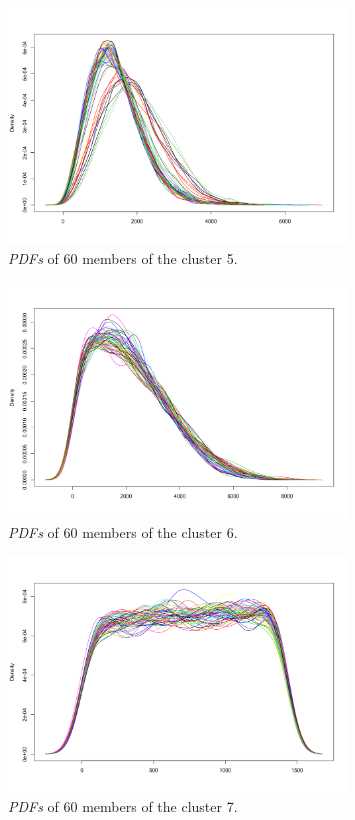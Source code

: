 \begin{figure}[H]
    \centering
    \includegraphics[width=0.8\textwidth]{images/cluster5.png}
    \caption{\textit{PDFs} of 60 members of the cluster 5.}
    \label{fig:cluster5}
\end{figure}

\begin{figure}[H]
    \centering
    \includegraphics[width=0.8\textwidth]{images/cluster6.png}
    \caption{\textit{PDFs} of 60 members of the cluster 6.}
    \label{fig:cluster6}
\end{figure}

\begin{figure}[H]
    \centering
    \includegraphics[width=0.8\textwidth]{images/cluster7.png}
    \caption{\textit{PDFs} of 60 members of the cluster 7.}
    \label{fig:cluster7}
\end{figure}

